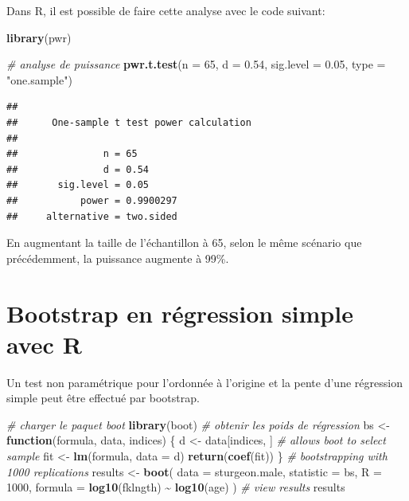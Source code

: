 \documentclass[
  12pt,
]{book}
\newenvironment{Shaded}{\begin{snugshade}}{\end{snugshade}}
\newcommand{\CommentTok}[1]{\textcolor[rgb]{0.56,0.35,0.01}{\textit{#1}}}
\newcommand{\ControlFlowTok}[1]{\textcolor[rgb]{0.13,0.29,0.53}{\textbf{#1}}}
\newcommand{\DataTypeTok}[1]{\textcolor[rgb]{0.13,0.29,0.53}{#1}}
\newcommand{\DecValTok}[1]{\textcolor[rgb]{0.00,0.00,0.81}{#1}}
\newcommand{\FloatTok}[1]{\textcolor[rgb]{0.00,0.00,0.81}{#1}}
\newcommand{\KeywordTok}[1]{\textcolor[rgb]{0.13,0.29,0.53}{\textbf{#1}}}
\newcommand{\NormalTok}[1]{#1}
\newcommand{\OperatorTok}[1]{\textcolor[rgb]{0.81,0.36,0.00}{\textbf{#1}}}
\newcommand{\StringTok}[1]{\textcolor[rgb]{0.31,0.60,0.02}{#1}}
\begin{document}
Dans R, il est possible de faire cette analyse avec le code suivant:

\begin{Shaded}
\begin{Highlighting}[]
\KeywordTok{library}\NormalTok{(pwr)}

\CommentTok{\# analyse de puissance}
\KeywordTok{pwr.t.test}\NormalTok{(}\DataTypeTok{n =} \DecValTok{65}\NormalTok{, }\DataTypeTok{d =} \FloatTok{0.54}\NormalTok{, }\DataTypeTok{sig.level =} \FloatTok{0.05}\NormalTok{, }\DataTypeTok{type =} \StringTok{"one.sample"}\NormalTok{)}
\end{Highlighting}
\end{Shaded}

\begin{verbatim}
## 
##      One-sample t test power calculation 
## 
##               n = 65
##               d = 0.54
##       sig.level = 0.05
##           power = 0.9900297
##     alternative = two.sided
\end{verbatim}

En augmentant la taille de l'échantillon à 65, selon le même scénario que précédemment, la puissance augmente à 99\%.

\hypertarget{bootstrap-en-ruxe9gression-simple-avec-r}{%
\section{Bootstrap en régression simple avec R}\label{bootstrap-en-ruxe9gression-simple-avec-r}}

Un test non paramétrique pour l'ordonnée à l'origine et la pente d'une régression simple peut être effectué par bootstrap.

\begin{Shaded}
\begin{Highlighting}[]
\CommentTok{\# charger le paquet boot}
\KeywordTok{library}\NormalTok{(boot)}
\CommentTok{\# obtenir les poids de régression}
\NormalTok{bs \textless{}{-}}\StringTok{ }\ControlFlowTok{function}\NormalTok{(formula, data, indices) \{}
\NormalTok{  d \textless{}{-}}\StringTok{ }\NormalTok{data[indices, ] }\CommentTok{\# allows boot to select sample}
\NormalTok{  fit \textless{}{-}}\StringTok{ }\KeywordTok{lm}\NormalTok{(formula, }\DataTypeTok{data =}\NormalTok{ d)}
  \KeywordTok{return}\NormalTok{(}\KeywordTok{coef}\NormalTok{(fit))}
\NormalTok{\}}
\CommentTok{\# bootstrapping with 1000 replications}
\NormalTok{results \textless{}{-}}\StringTok{ }\KeywordTok{boot}\NormalTok{(}
  \DataTypeTok{data =}\NormalTok{ sturgeon.male,}
  \DataTypeTok{statistic =}\NormalTok{ bs,}
  \DataTypeTok{R =} \DecValTok{1000}\NormalTok{, }\DataTypeTok{formula =} \KeywordTok{log10}\NormalTok{(fklngth) }\OperatorTok{\textasciitilde{}}\StringTok{ }\KeywordTok{log10}\NormalTok{(age)}
\NormalTok{)}
\CommentTok{\# view results}
\NormalTok{results}
\end{Highlighting}
\end{Shaded}
\end{document}
